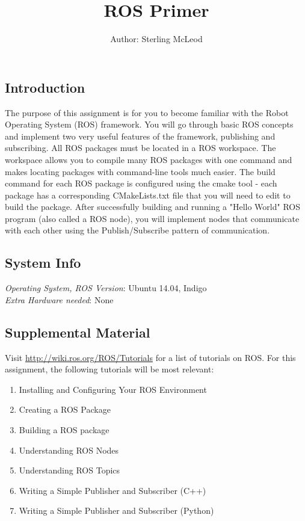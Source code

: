 \documentclass[12pt]{article}
\begin{document}
 
\title{ROS Primer}
\author{Author: Sterling McLeod}
\maketitle

\subsection*{Introduction}

The purpose of this assignment is for you to become familiar with the Robot Operating System (ROS) framework. You will go through basic ROS concepts and implement two very useful features of the framework, publishing and subscribing. All ROS packages must be located in a ROS workspace. The workspace allows you to compile many ROS packages with one command and makes locating packages with command-line tools much easier. The build command for each ROS package is configured using the cmake tool - each package has a corresponding CMakeLists.txt file that you will need to edit to build the package. After successfully building and running a "Hello World" ROS program (also called a ROS node), you will implement nodes that communicate with each other using the Publish/Subscribe pattern of communication. 

\subsection*{System Info}
\emph{Operating System, ROS Version}: Ubuntu 14.04, Indigo\\
\emph{Extra Hardware needed}: None
 
\subsection*{Supplemental Material}

Visit \href{http://wiki.ros.org/ROS/Tutorials}{http://wiki.ros.org/ROS/Tutorials} for a list of tutorials on ROS. For this assignment, the following tutorials will be most relevant:

\begin{enumerate}
\item Installing and Configuring Your ROS Environment
\item Creating a ROS Package
\item Building a ROS package
\item Understanding ROS Nodes
\item Understanding ROS Topics
\item Writing a Simple Publisher and Subscriber (C++)
\item Writing a Simple Publisher and Subscriber (Python)
\end{enumerate}
\end{document}
